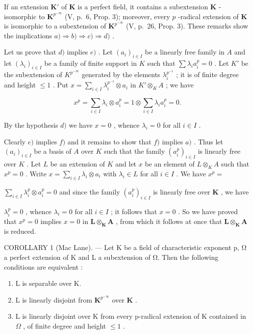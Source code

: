 If an extension \(\mathbf{K}'\) of \(\mathbf{K}\) is a perfect field, it contains a subextension \(\mathbf{K}\) -isomorphic to \(\mathbf{K}^{p^{-\infty}}\) (V, p.~6, Prop. 3); moreover, every \(p\) -radical extension of \(\mathbf{K}\) is isomorphic to a subextension of \(\mathbf{K}^{p^{-\infty}}\) (V, p.~26, Prop. 3). These remarks show the implications \(a) \Rightarrow b) \Rightarrow c) \Rightarrow d)\) .

Let us prove that \(d)\) implies \(e)\) . Let \((a_i)_{i \in I}\) be a linearly free family in \(A\) and let \((\lambda_i)_{i \in I}\) be a family of finite support in \(K\) such that \(\sum \lambda_i a_i^p = 0\) . Let \(K'\) be the subextension of \(K^{p^{-\infty}}\) generated by the elements \(\lambda_i^{p^{-1}}\) ; it is of finite degree and height \(\leqslant 1\) . Put \(x = \sum_{i \in I} \lambda_i^{p^{-1}} \otimes a_i\) in \(K' \otimes_K A\) ; we have

\[
x ^ {p} = \sum_ {i \in I} \lambda_ {i} \otimes a _ {i} ^ {p} = 1 \otimes \sum_ {i \in I} \lambda_ {i} a _ {i} ^ {p} = 0.
\]

By the hypothesis \(d)\) we have \(x = 0\) , whence \(\lambda_i = 0\) for all \(i \in I\) .

Clearly \(e)\) implies \(f)\) and it remains to show that \(f)\) implies \(a)\) . Thus let \((a_i)_{i \in I}\) be a basis of \(A\) over \(K\) such that the family \((a_i^p)_{i \in I}\) is linearly free over \(K\) . Let \(L\) be an extension of \(K\) and let \(x\) be an element of \(L \otimes_K A\) such that \(x^p = 0\) . Write \(x = \sum_{i \in I} \lambda_i \otimes a_i\) with \(\lambda_i \in L\) for all \(i \in I\) . We have \(x^p =\)

\(\sum_{i\in I}\lambda_i^p\otimes a_i^p = 0\) and since the family \((a_i^p)_{i\in I}\) is linearly free over \(\mathbf{K}\) , we have

\(\lambda_{i}^{p} = 0\) , whence \(\lambda_{i} = 0\) for all \(i \in I\) ; it follows that \(x = 0\) . So we have proved that \(x^{p} = 0\) implies \(x = 0\) in \(\mathbf{L} \otimes_{\mathbf{K}} \mathbf{A}\) , from which it follows at once that \(\mathbf{L} \otimes_{\mathbf{K}} \mathbf{A}\) is reduced.

COROLLARY 1 (Mac Lane). --- Let K be a field of characteristic exponent p, Ω a perfect extension of K and L a subextension of Ω. Then the following conditions are equivalent :

\begin{enumerate}
\def\labelenumi{\alph{enumi})}
\item
  L is separable over K.
\item
  L is linearly disjoint from \(\mathbf{K}^{p^{-\infty}}\) over \(\mathbf{K}\) .
\item
  L is linearly disjoint over K from every p-radical extension of K contained in \(\Omega\) , of finite degree and height \(\leqslant 1\) .
\end{enumerate}

